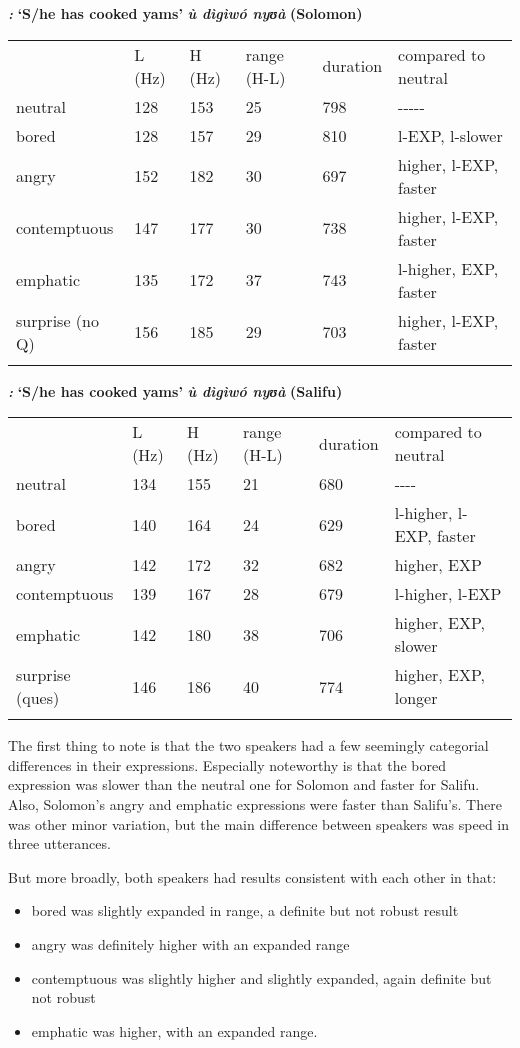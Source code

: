 \documentclass[output=paper]{langsci/langscibook}
\begin{document}
\emph{\textbf{\textup{:}}}\textbf{ ‘}\textbf{S/he has cooked yams’  }\emph{\textbf{ù dìgìwó nyʊà}}\textbf{  (Solomon) }

\begin{tabular}{llllll} & L (Hz) & H (Hz) & range (H-L) & duration & compared to neutral\\
\lsptoprule
neutral & 128 & 153 & 25 & 798 & {}-{}-{}-{}-{}-\\
bored & 128 & 157 & 29 & 810 & l-EXP, l-slower\\
angry & 152 & 182 & 30 & 697 & higher, l-EXP, faster\\
contemptuous & 147 & 177 & 30 & 738 & higher, l-EXP, faster\\
emphatic & 135 & 172 & 37 & 743 & l-higher, EXP, faster\\
surprise (no Q) & 156 & 185 & 29 & 703 & higher, l-EXP, faster\\
\lspbottomrule
\end{tabular}
\emph{\textbf{\textup{:}}}\textbf{ ‘}\textbf{S/he has cooked yams’  }\emph{\textbf{ù dìgìwó nyʊà}}\textbf{  (Salifu)}

\begin{tabular}{llllll} & L (Hz) & H (Hz) & range (H-L) & duration & compared to neutral\\
\lsptoprule
neutral & 134 & 155 & 21 & 680 & {}-{}-{}-{}-\\
bored & 140 & 164 & 24 & 629 & l-higher, l-EXP, faster\\
angry & 142 & 172 & 32 & 682 & higher, EXP\\
contemptuous & 139 & 167 & 28 & 679 & l-higher, l-EXP\\
emphatic & 142 & 180 & 38 & 706 & higher, EXP, slower\\
surprise (ques) & 146 & 186 & 40 & 774 & higher, EXP, longer\\
\lspbottomrule
\end{tabular}
The first thing to note is that the two speakers had a few seemingly categorial differences in their expressions. Especially noteworthy is that the bored expression was slower than the neutral one for Solomon and faster for Salifu. Also, Solomon’s angry and emphatic expressions were faster than Salifu’s. There was other minor variation, but the main difference between speakers was speed in three utterances.

But more broadly, both speakers had results consistent with each other in that:

\begin{itemize}
\item bored was slightly expanded in range, a definite but not robust result
\item angry was definitely higher with an expanded range
\item contemptuous was slightly higher and slightly expanded, again definite but not robust
\item emphatic was higher, with an expanded range. 
\end{itemize}
\end{document}

